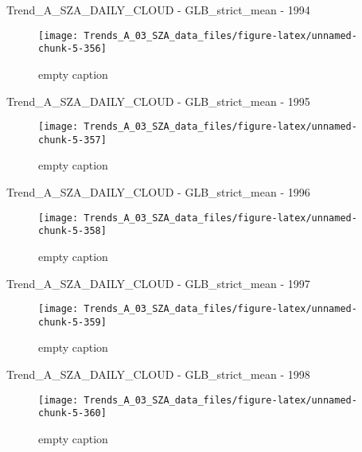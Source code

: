 \documentclass[
  10pt,
  a4paper,oneside]{article}
\begin{document}
Trend\_A\_SZA\_DAILY\_CLOUD - GLB\_strict\_mean - 1994

\begin{figure}[!ht]

{\centering \texttt{[image: Trends\_A\_03\_SZA\_data\_files/figure-latex/unnamed-chunk-5-356]} 

}

\caption{ empty caption }\label{fig:unnamed-chunk-5-356}
\end{figure}

Trend\_A\_SZA\_DAILY\_CLOUD - GLB\_strict\_mean - 1995

\begin{figure}[!ht]

{\centering \texttt{[image: Trends\_A\_03\_SZA\_data\_files/figure-latex/unnamed-chunk-5-357]} 

}

\caption{ empty caption }\label{fig:unnamed-chunk-5-357}
\end{figure}

Trend\_A\_SZA\_DAILY\_CLOUD - GLB\_strict\_mean - 1996

\begin{figure}[!ht]

{\centering \texttt{[image: Trends\_A\_03\_SZA\_data\_files/figure-latex/unnamed-chunk-5-358]} 

}

\caption{ empty caption }\label{fig:unnamed-chunk-5-358}
\end{figure}

Trend\_A\_SZA\_DAILY\_CLOUD - GLB\_strict\_mean - 1997

\begin{figure}[!ht]

{\centering \texttt{[image: Trends\_A\_03\_SZA\_data\_files/figure-latex/unnamed-chunk-5-359]} 

}

\caption{ empty caption }\label{fig:unnamed-chunk-5-359}
\end{figure}

Trend\_A\_SZA\_DAILY\_CLOUD - GLB\_strict\_mean - 1998

\begin{figure}[!ht]

{\centering \texttt{[image: Trends\_A\_03\_SZA\_data\_files/figure-latex/unnamed-chunk-5-360]} 

}

\caption{ empty caption }\label{fig:unnamed-chunk-5-360}
\end{figure}
\end{document}
